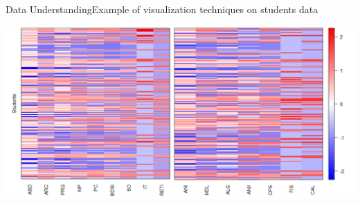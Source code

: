 \begin{frame}{Data Understanding}{Example of visualization techniques on students data}

    \vspace{0.5cm}
    \hspace*{-0.8cm}\includegraphics[scale=0.275]{img4.png}

\end{frame}